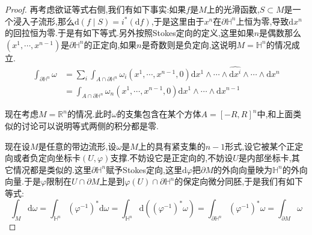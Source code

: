 \begin{enumerate}
\begin{proof}
		再考虑欲证等式右侧,我们有如下事实:如果$f$是$M$上的光滑函数,$S\subset M$是一个浸入子流形,那么$\mathrm{d}(f\mid S)=i^*(\mathrm{d}f)$,于是这里由于$x^n$在$\partial\mathbb{H}^n$上恒为零,导致$\mathrm{d}x^n$的回拉恒为零.于是有如下等式.另外按照Stokes定向的定义,这里如果$n$是偶数那么$(x^1,\cdots,x^{n-1})$是$\partial\mathbb{H}^n$的正定向,如果$n$是奇数则是负定向,这说明$M=\mathbb{H}^n$的情况成立.
		\begin{align*}
		\int_{\partial\mathbb{H}^n}\omega&=\sum_i\int_{A\cap\partial\mathbb{H}^n}\omega_i(x^1,\cdots,x^{n-1},0)\mathrm{d}x^1\wedge\cdots\wedge\hat{\mathrm{d}x^i}\wedge\cdots\wedge\mathrm{d}x^n\\&=\int_{A\cap\partial\mathbb{H}^n}\omega_n(x^1,\cdots,x^{n-1},0)\mathrm{d}x^1\wedge\cdots\wedge\mathrm{d}x^{n-1}
		\end{align*}
		
		现在考虑$M=\mathbb{R}^n$的情况.此时$\omega$的支集包含在某个方体$A=[-R,R]^n$中,和上面类似的讨论可以说明等式两侧的积分都是零.
		
		现在设$M$是任意的带边流形,设$\omega$是$M$上的具有紧支集的$n-1$形式,设它被某个正定向或者负定向坐标卡$(U,\varphi)$支撑.不妨设它是正定向的,不妨设$U$是内部坐标卡,其它情况都是类似的.这里$\partial\mathbb{H}^n$赋予Stokes定向,这里$\mathrm{d}\varphi$把$\partial M$的外向向量映为$\mathbb{H}^n$的外向向量.于是$\varphi$限制在$U\cap\partial M$上是到$\varphi(U)\cap\partial\mathbb{H}^n$的保定向微分同胚,于是我们有如下等式:
		$$\int_M\mathrm{d}\omega=\int_{\mathbb{H}^n}(\varphi^{-1})^*\mathrm{d}\omega=\int_{\mathbb{H}^n}\mathrm{d}\left((\varphi^{-1})^*\omega\right)=\int_{\partial\mathbb{H}^n}(\varphi^{-1})^*\omega=\int_{\partial M}\omega$$
		

\end{proof}
\end{enumerate}
